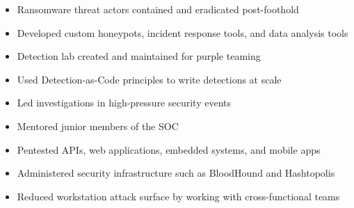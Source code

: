 \documentclass[../../../main.tex]{subfiles}
\begin{document}
\begin{itemize}
    \item Ransomware threat actors contained and eradicated post-foothold
    \item Developed custom honeypots, incident response tools, and data analysis tools
    \item Detection lab created and maintained for purple teaming
    \item Used Detection-as-Code principles to write detections at scale
    \item Led investigations in high-pressure security events
    \item Mentored junior members of the SOC
    \item Pentested APIs, web applications, embedded systems, and mobile apps
    \item Administered security infrastructure such as BloodHound and Hashtopolis
    \item Reduced workstation attack surface by working with cross-functional teams
\end{itemize}
\end{document}
